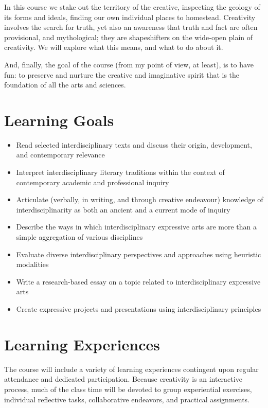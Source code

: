 \documentclass[10pt,DIV09,letterpaper,oneside,headsepline]{scrreprt}
\begin{document}
In this course we stake out the territory of the creative, inspecting the geology of its forms and ideals, finding our own individual places to homestead. Creativity involves the search for truth, yet also an awareness that truth and fact are often provisional, and mythological; they are shapeshifters on the wide-open plain of creativity. We will explore what this means, and what to do about it.

And, finally, the goal of the course (from my point of view, at least), is to have fun: to preserve and nurture the creative and imaginative spirit that is the foundation of all the arts and sciences.

\section{Learning Goals}
\begin{itemize}

\item Read selected interdisciplinary texts and discuss their origin, development, and contemporary relevance
\item Interpret interdisciplinary literary traditions within the context of contemporary academic and professional inquiry
\item Articulate (verbally, in writing, and through creative endeavour) knowledge of interdisciplinarity as both an ancient and a current mode of inquiry
\item Describe the ways in which interdisciplinary expressive arts are more than a simple aggregation of various disciplines
\item Evaluate diverse interdisciplinary perspectives and approaches using heuristic modalities
\item Write a research-based essay on a topic related to interdisciplinary expressive arts
\item Create expressive projects and presentations using interdisciplinary principles

\end{itemize}

\section{Learning Experiences}
The course will include a variety of learning experiences contingent upon regular attendance and dedicated participation. Because creativity is an interactive process, much of the class time will be devoted to group experiential exercises, individual reflective tasks, collaborative endeavors, and practical assignments.
\end{document}
